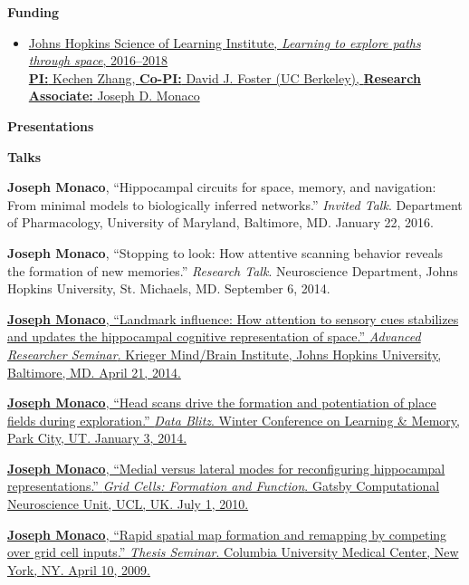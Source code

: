 \documentclass[10pt]{article}
\begin{document}
{\large \textbf{Funding}}
\begin{itemize}
  \item \href{http://scienceoflearning.jhu.edu/research/learning-to-explore-paths-through-space}{Johns Hopkins Science of Learning Institute, \emph{Learning to explore paths through space}, 2016--2018 \\
    \textbf{PI:} Kechen Zhang, \textbf{Co-PI:} David J. Foster (UC Berkeley), \textbf{Research Associate:} Joseph D. Monaco}
\end{itemize}

{\large \textbf{Presentations}}

\begin{description}
\item \textbf{Talks}
\item[\quad] \textbf{Joseph Monaco}, ``Hippocampal circuits for space, memory, and navigation: From minimal models to biologically inferred networks.'' \emph{Invited Talk}. Department of Pharmacology, University of Maryland, Baltimore, MD. January 22, 2016.
\item[\quad] \textbf{Joseph Monaco}, ``Stopping to look: How attentive scanning behavior reveals the formation of new memories.'' \emph{Research Talk}. Neuroscience Department, Johns Hopkins University, St. Michaels, MD. September 6, 2014.
\item[\quad] \href{http://jdmonaco.com/files/mbi-seminar-abstract.pdf}{\textbf{Joseph Monaco}, ``Landmark influence: How attention to sensory cues stabilizes and updates the hippocampal cognitive representation of space.'' \emph{Advanced Researcher Seminar}. Krieger Mind/Brain Institute, Johns Hopkins University, Baltimore, MD. April 21, 2014.}
\item[\quad] \href{http://jdmonaco.com/files/ScanningSlide.pdf}{\textbf{Joseph Monaco}, ``Head scans drive the formation and potentiation of place fields during exploration.'' \emph{Data Blitz}. Winter Conference on Learning \& Memory, Park City, UT. January 3, 2014.}
\item[\quad] \href{http://www.gatsby.ucl.ac.uk/workshopjune2010/abstractmonaco.htm}{\textbf{Joseph Monaco}, ``Medial versus lateral modes for reconfiguring hippocampal representations.'' \emph{Grid Cells: Formation and Function}. Gatsby Computational Neuroscience Unit, UCL, UK. July 1, 2010.}
\item[\quad] \href{http://dx.doi.org/10.6084/m9.figshare.693750}{\textbf{Joseph Monaco}, ``Rapid spatial map formation and remapping by competing over grid cell inputs.'' \emph{Thesis Seminar}. Columbia University Medical Center, New York, NY. April 10, 2009.}
\end{description}
\end{document}
